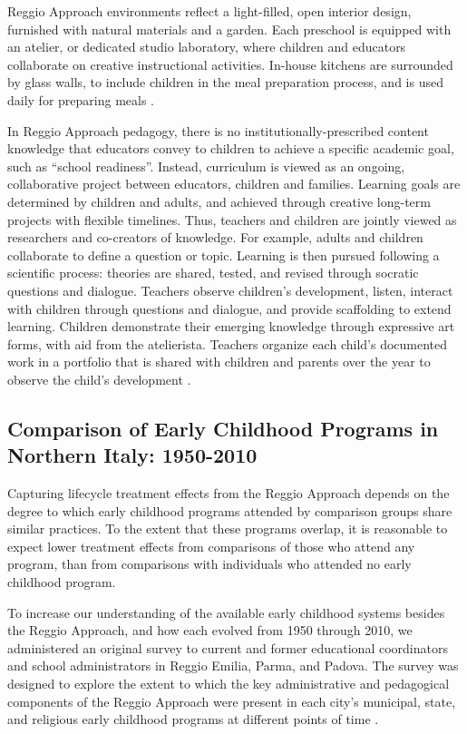 Reggio Approach environments reflect a light-filled, open interior design, furnished with natural materials and a garden. Each preschool is equipped with an atelier, or dedicated studio laboratory, where children and educators collaborate on creative instructional activities. In-house kitchens are surrounded by glass walls, to include children in the meal preparation process, and is used daily for preparing meals \citep{Rinaldi_2006_ReggioEmilia_BOOK,Vecchi_2010_ReggioEmilia_BOOK}. 

In Reggio Approach pedagogy, there is no institutionally-prescribed content knowledge that educators convey to children to achieve a specific academic goal, such as ``school readiness''. Instead, curriculum is viewed as an ongoing, collaborative project between educators, children and families. Learning goals are determined by children and adults, and achieved through creative long-term projects with flexible timelines. Thus, teachers and children are jointly viewed as researchers and co-creators of knowledge. For example, adults and children collaborate to define a question or topic. Learning is then pursued following a scientific process: theories are shared, tested, and revised through socratic questions and dialogue. Teachers observe children's development, listen, interact with children through questions and dialogue, and provide scaffolding to extend learning. Children demonstrate their emerging knowledge through expressive art forms, with aid from the atelierista. Teachers organize each child's documented work in a portfolio that is shared with children and parents over the year to observe the child's development \citep{Rinaldi_2006_ReggioEmilia_BOOK,Giudici-Nicolosi_2014_Reggio-Approach}.

\subsection{Comparison of Early Childhood Programs in Northern Italy: 1950-2010}

Capturing lifecycle treatment effects from the Reggio Approach depends on the degree to which early childhood programs attended by comparison groups share similar practices. To the extent that these programs overlap, it is reasonable to expect lower treatment effects from comparisons of those who attend any program, than from comparisons with individuals who attended no early childhood program. 

To increase our understanding of the available early childhood systems besides the Reggio Approach, and how each evolved from 1950 through 2010, we administered an original survey to current and former educational coordinators and school administrators in Reggio Emilia, Parma, and Padova. The survey was designed to explore the extent to which the key administrative and pedagogical components of the Reggio Approach were present in each city's municipal, state, and religious early childhood programs at different points of time \citep{CEHD_2016_Historical-Analysis}. 

